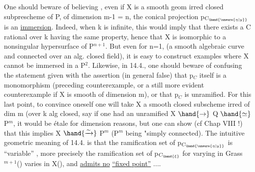 One should beware of believing , even if X is a smooth
geom irred closed subprescheme of P, of dimension m-1 = n,  the conical projection p$_{C_{\hand{\unsure{\eta|y}}}}$
is  an \uline{immersion}. Indeed, when k is infinite, this would imply
that there exists a C rational over k having the same property, hence that X
is isomorphic to a nonsingular hypersurface of  P$^{n+1}$. But
even for n=1, (a smooth  algebraic curve  and connected over an alg.
closed field), it is easy to construct examples where X cannot be immersed
in a P$^2$. Likewise, in 14.4., one should beware of confusing the
statement given with the assertion (in general false) that p$_C$ itself is a
monomorphism (preceding counterexample, or a still more evident counterexample
if X is smooth of dimension m), or that p$_C$ is
unramified. For this last point, to convince oneself one will take X
a smooth closed subscheme  irred of dim m (over k alg closed, say
if  one had an unramified X $\hand{\to}$ Q $\hand{\simeq}$ P$^m$, it would be étale for
dimension reasons, but one can show (cf Chap VIII !) that this implies
X $\hand{\xrightarrow{\sim}}$ P$^m$ (P$^m$ being "simply connected). \hand{--} The intuitive geometric
meaning of 14.4. is that the ramification
set of p$_{C_{\hand{\unsure{\eta|y}}}}$ is ``variable'' , more precisely the ramification
set of p$_{C_{\hand{\xi}}}$ for \hand{\xi} varying in  Grass$^{m+1}$() varies in X(), and
\uline{admits no}  \uline{``fixed point''} ....

